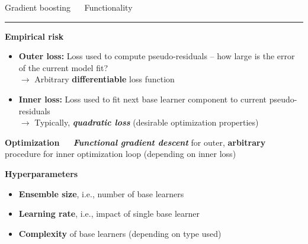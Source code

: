 \documentclass[11pt,compress,t,notes=noshow, xcolor=table]{beamer}
\begin{document}

\LARGE
\begin{frame}{\textcolor{gray!80}{Gradient boosting} ~~ Functionality}
\normalsize
\vspace{-0.5cm}
\noindent \textcolor{gray!80}{\rule{\textwidth}{1pt}}

\vspace{0.3cm}

\footnotesize

\textbf{\textcolor{gray!80}{Empirical risk}}

\begin{itemize}
  \item \textbf{Outer loss:} Loss used to compute pseudo-residuals -- how large 
  is the error of the current model fit? \\
  $\rightarrow$ Arbitrary \textbf{differentiable} loss function
  \item \textbf{Inner loss:} Loss used to fit next base learner component to 
  current pseudo-residuals \\
  $\rightarrow$ Typically, \textit{\textbf{quadratic loss}} (desirable 
  optimization properties)
\end{itemize}

\medskip

\textbf{\textcolor{gray!80}{Optimization}} ~~ \textit{\textbf{Functional 
gradient descent}} for outer, \textbf{arbitrary} procedure for inner 
optimization loop (depending on inner loss)

\medskip

\textbf{\textcolor{gray!80}{Hyperparameters}}

\begin{itemize}
  \item \textbf{Ensemble size}, i.e., number of base learners
  \item \textbf{Learning rate}, i.e., impact of single base learner
  \item \textbf{Complexity} of base learners (depending on type used)
\end{itemize}

\end{frame}


\endlecture
\end{document}

